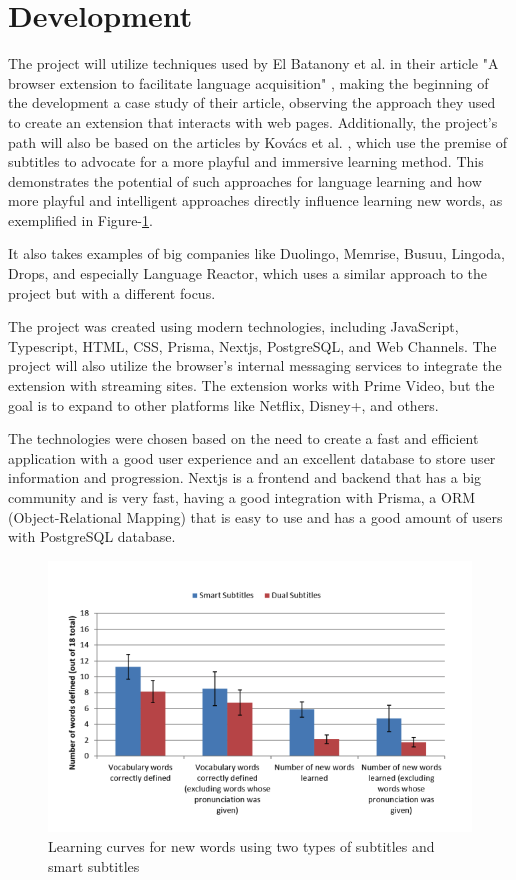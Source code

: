 \documentclass[12pt]{article}
\begin{document}
\section{Development}

The project will utilize techniques used by El Batanony et al. in their article "A browser extension to facilitate language acquisition" \cite{ElBatanony21}, making the beginning of the development a case study of their article, observing the approach they used to create an extension that interacts with web pages. Additionally, the project's path will also be based on the articles by Kovács et al. \cite{Kovacs14}, which use the premise of subtitles to advocate for a more playful and immersive learning method. This demonstrates the potential of such approaches for language learning and how more playful and intelligent approaches directly influence learning new words, as exemplified in Figure-\ref{fig:my_label}.

It also takes examples of big companies like Duolingo, Memrise, Busuu, Lingoda, Drops, and especially Language Reactor, which uses a similar approach to the project but with a different focus. 

The project was created using modern technologies, including JavaScript, Typescript, HTML, CSS, Prisma, Nextjs, PostgreSQL, and Web Channels. The project will also utilize the browser's internal messaging services to integrate the extension with streaming sites. The extension works with Prime Video, but the goal is to expand to other platforms like Netflix, Disney+, and others.

The technologies were chosen based on the need to create a fast and efficient application with a good user experience and an excellent database to store user information and progression. Nextjs is a frontend and backend that has a big community and is very fast, having a good integration with Prisma, a ORM (Object-Relational Mapping) that is easy to use and has a good amount of users with PostgreSQL database. 



\begin{figure}
\centering
\caption{Learning curves for new words using two types of subtitles and smart subtitles}
\label{fig:my_label}
\includegraphics[width=1\textwidth]{assets/3.png}
\end{figure}
\end{document}
